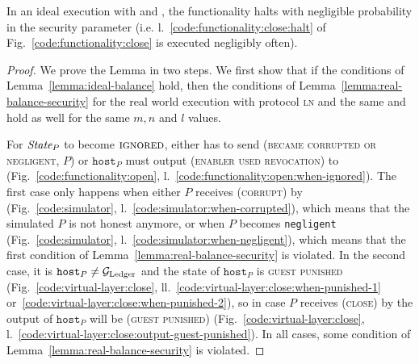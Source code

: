\begin{lemma}[No halt]
\label{lemma:no-halt}
  In an ideal execution with \fchan and \simulator, the functionality halts with
  negligible probability in the security parameter (i.e.
  l.~\ref{code:functionality:close:halt} of Fig.~\ref{code:functionality:close}
  is executed negligibly often).
\end{lemma}

\begin{proof}
  We prove the Lemma in two steps. We first show that if the conditions of
  Lemma~\ref{lemma:ideal-balance} hold, then the conditions of
  Lemma~\ref{lemma:real-balance-security} for the real world execution with
  protocol \textsc{ln} and the same \environment and \adversary hold as well for
  the same $m, n$ and $l$ values.

  For $\itistate_P$ to become $\textsc{ignored}$, either \simulator has to send
  (\textsc{became corrupted or negligent}, $P$) or $\texttt{host}_P$ must output
  (\textsc{enabler used revocation}) to \fchan
  (Fig.~\ref{code:functionality:open},
  l.~\ref{code:functionality:open:when-ignored}). The first case only happens
  when either $P$ receives (\textsc{corrupt}) by \adversary
  (Fig.~\ref{code:simulator}, l.~\ref{code:simulator:when-corrupted}), which
  means that the simulated $P$ is not honest anymore, or when $P$ becomes
  \texttt{negligent} (Fig.~\ref{code:simulator},
  l.~\ref{code:simulator:when-negligent}), which means that the first condition
  of Lemma~\ref{lemma:real-balance-security} is violated. In the second case, it
  is $\texttt{host}_P \neq \mathcal{G}_{\mathrm{Ledger}}$ and the state of $\texttt{host}_P$ is
  \textsc{guest punished} (Fig.~\ref{code:virtual-layer:close},
  ll.~\ref{code:virtual-layer:close:when-punished-1}
  or~\ref{code:virtual-layer:close:when-punished-2}), so in case $P$ receives
  (\textsc{close}) by \environment the output of $\texttt{host}_P$ will be
  (\textsc{guest punished}) (Fig.~\ref{code:virtual-layer:close},
  l.~\ref{code:virtual-layer:close:output-guest-punished}). In all cases, some
  condition of Lemma~\ref{lemma:real-balance-security} is violated.


\end{proof}

